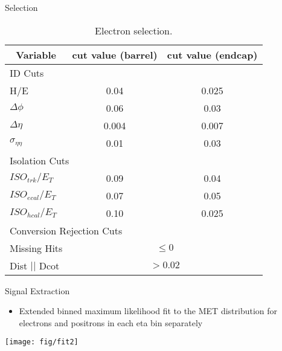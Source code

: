 \documentclass[8pt]{beamer}
\begin{document}
\begin{frame}{Selection}
\tiny{
\begin{center}
    \begin{table}[htbp]
    \begin{tabular}{|lcc|} \hline
      \multicolumn{1}{|c}{Variable} & \multicolumn{1}{c}{cut value (barrel)}& \multicolumn{1}{c|}{cut value (endcap)}\\
        \hline   \hline
       \multicolumn{3}{|l|}{ID Cuts}\\ \hline
        H/E & 0.04 & 0.025 \\
        $\Delta\phi$ & 0.06 & 0.03 \\
        $\Delta\eta$ & 0.004 & 0.007  \\
        $\sigma_{\eta\eta}$ & 0.01 & 0.03 \\ \hline
      \multicolumn{3}{|l|}{Isolation Cuts}\\ \hline
       $ISO_{trk} / E_T $  & 0.09 & 0.04 \\
       $ISO_{ecal}/ E_T$  & 0.07 & 0.05 \\
       $ISO_{hcal}/ E_T$  & 0.10 & 0.025 \\ \hline
      \multicolumn{3}{|l|}{Conversion Rejection Cuts}\\ \hline
       Missing Hits  & \multicolumn{2}{c|}{$\leq 0$}\\
       Dist $||$ Dcot   & \multicolumn{2}{c|}{$>0.02$}\\
      \hline
    \end{tabular}
    \caption{\label{tab:elecuts} Electron selection.}%
    \end{table}
\end{center}
    }
\end{frame}

\begin{frame}{Signal Extraction}
  \begin{itemize}
    \item Extended binned maximum likelihood fit to the MET distribution for
    electrons and positrons in each eta bin separately
  \end{itemize}
    \begin{center}
      \texttt{[image: fig/fit2]}
    \end{center}
\end{frame}
\end{document}
